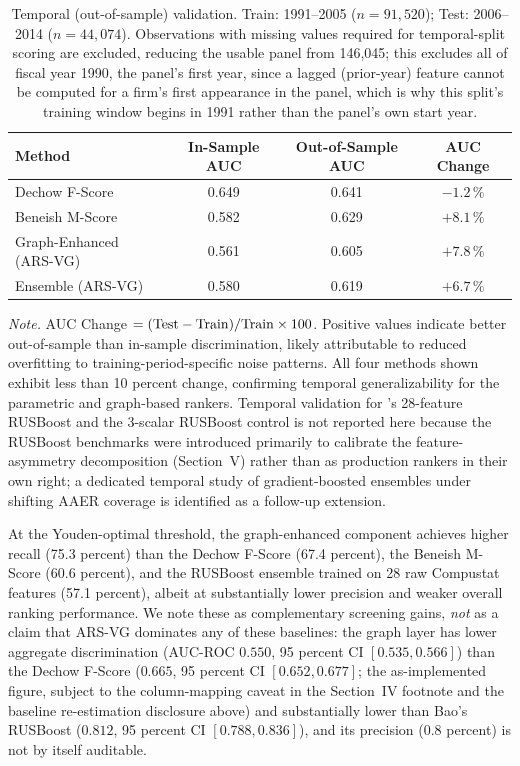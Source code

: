 \documentclass[12pt]{article}
\begin{document}
\begin{table}[tbp]
\centering
\caption{Temporal (out-of-sample) validation.
         Train: 1991--2005 ($n = 91{,}520$);
         Test: 2006--2014 ($n = 44{,}074$).
         Observations with missing values required for temporal-split
         scoring are excluded, reducing the usable panel from 146{,}045;
         this excludes all of fiscal year 1990, the panel's first year,
         since a lagged (prior-year) feature cannot be computed for a
         firm's first appearance in the panel, which is why this split's
         training window begins in 1991 rather than the panel's own
         start year.}
\label{tab:temporal}
\small
\begin{tabular}{lccc}
\toprule
\textbf{Method} &
\textbf{In-Sample AUC} &
\textbf{Out-of-Sample AUC} &
\textbf{AUC Change} \\
\midrule
Dechow F-Score \citep{dechow2011}
  & 0.649 & 0.641 & $-1.2\,\%$ \\
Beneish M-Score \citep{beneish1999}
  & 0.582 & 0.629 & $+8.1\,\%$ \\
Graph-Enhanced (ARS-VG)
  & 0.561 & 0.605 & $+7.8\,\%$ \\
Ensemble (ARS-VG)
  & 0.580 & 0.619 & $+6.7\,\%$ \\
\bottomrule
\end{tabular}
\end{table}

\noindent\textit{Note.}
AUC Change $= ({\rm Test} - {\rm Train})/{\rm Train} \times 100$.
Positive values indicate better out-of-sample than in-sample
discrimination, likely attributable to reduced overfitting to
training-period-specific noise patterns.  All four methods shown
exhibit less than 10 percent change, confirming temporal generalizability
for the parametric and graph-based rankers.  Temporal validation
for \citet{bao2020}'s 28-feature RUSBoost and the 3-scalar RUSBoost
control is not reported here because the RUSBoost benchmarks were
introduced primarily to calibrate the feature-asymmetry
decomposition (Section~V) rather than as
production rankers in their own right; a dedicated temporal study
of gradient-boosted ensembles under shifting AAER coverage is
identified as a follow-up extension.

At the Youden-optimal threshold, the graph-enhanced component achieves
higher recall (75.3 percent) than the Dechow F-Score
(67.4 percent), the Beneish M-Score (60.6 percent), and the
\citet{bao2020} RUSBoost ensemble trained on 28 raw Compustat features
(57.1 percent), albeit at substantially lower precision and weaker overall
ranking performance.  We note these as complementary screening gains,
\emph{not} as a claim that ARS-VG dominates any of these baselines: the
graph layer has lower aggregate discrimination (AUC-ROC $0.550$,
95 percent CI $[0.535, 0.566]$) than the Dechow F-Score ($0.665$,
95 percent CI $[0.652, 0.677]$; the as-implemented figure, subject to the
column-mapping caveat in the Section~IV footnote and the baseline
re-estimation disclosure above) and substantially lower than Bao's RUSBoost
($0.812$, 95 percent CI $[0.788, 0.836]$), and its precision (0.8 percent) is
not by itself auditable.
\end{document}
